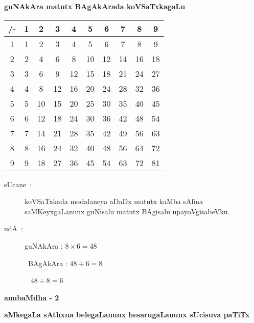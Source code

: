 \begin{center}
{\large\bf guNAkAra matutx BAgAkArada koVSaTxkagaLu}

\smallskip
{\large\bf  {}}
\end{center}

\smallskip
\begin{center}
\renewcommand{\arraystretch}{1.25}
\begin{tabular}{|>{\rm}c<{\rm}|>{\rm}c<{\rm}|>{\rm}c<{\rm}|>{\rm}c<{\rm}|>{\rm}c<{\rm}|>{\rm}c<{\rm}|>{\rm}c<{\rm}|>{\rm}c<{\rm}|>{\rm}c<{\rm}|>{\rm}c<{\rm}|}
\hline
/- & 1 & 2 & 3 & 4 & 5 & 6 & 7 & 8 & 9\\
\hline
1 & 1 & 2 & 3 & 4 & 5 & 6 & 7 & 8 & 9\\
\hline
2 & 2 & 4 & 6 & 8 & 10 & 12 & 14 & 16 & 18\\
\hline
3 & 3 & 6 & 9 & 12 & 15 & 18 & 21 & 24 & 27\\
\hline
4 & 4 & 8 & 12 & 16 & 20 & 24 & 28 & 32 & 36\\
\hline
5 & 5 & 10 & 15 & 20 & 25 & 30 & 35 & 40 & 45\\
\hline
6 & 6 & 12 & 18 & 24 & 30 & 36 & 42 & 48 & 54\\
\hline
7 & 7 & 14 & 21 & 28 & 35 & 42 & 49 & 56 & 63\\
\hline
8 & 8 & 16 & 24 & 32 & 40 & 48 & 56 & 64 & 72\\
\hline
9 & 9 & 18 & 27 & 36 & 45 & 54 & 63 & 72 & 81\\
\hline
\end{tabular}
\end{center}

\medskip
\begin{center}
\begin{minipage}[c]{10cm}
\begin{description}
\item[sUcane~:] koVSaTxkada modalaneya aDaDx matutx kaMba sAlina saMKeyxgaLanunx guNisalu matutx BAgisalu upayoVgisabeVku.

\item[udA~:] guNAkAra : $8\times 6=48$ 

~BAgAkAra : $48\div 6 = 8$

~\phantom{iAAAAA} $48\div 8 = 6$
\end{description}
\end{minipage}
\end{center}


\begin{center}
{\Large\bf anubaMdha - 2}

\smallskip
{\large\bf aMkegaLa sAthxna belegaLanunx hesarugaLanunx sUcisuva paTiTx}

\smallskip
{\large\bf {}}
\end{center}

